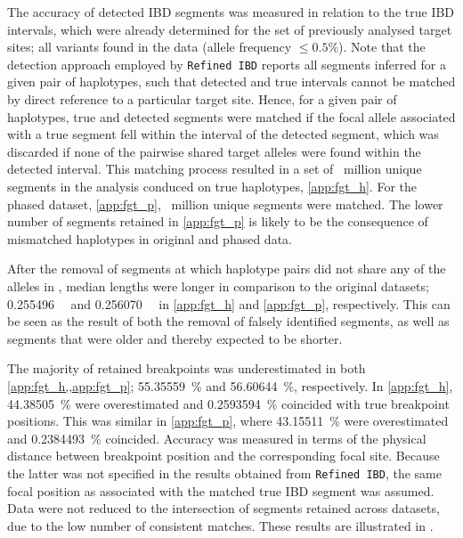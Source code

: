 The accuracy of detected IBD segments was measured in relation to the true IBD intervals, which were already determined for the set of previously analysed target sites; \ie all \fk{[2,25]} variants found in the data (allele frequency $\leq 0.5\%$).
Note that the detection approach employed by \texttt{Refined\,IBD} reports all segments inferred for a given pair of haplotypes, such that detected and true intervals cannot be matched by direct reference to a particular target site.
Hence, for a given pair of haplotypes, true and detected segments were matched if the focal allele associated with a true segment fell within the interval of the detected segment, which was discarded if none of the pairwise shared target alleles were found within the detected interval.
This matching process resulted in a set of ~million unique segments in the analysis conduced on true haplotypes, \cref{app:fgt_h}.
For the phased dataset, \cref{app:fgt_p}, ~million unique segments were matched.
The lower number of segments retained in \cref{app:fgt_p} is likely to be the consequence of mismatched haplotypes in original and phased data.

After the removal of segments at which haplotype pairs did not share any of the alleles in \fk{[2,25]}, median lengths were longer in comparison to the original datasets; \SI{0.255496}{\mega\basepair} and \SI{0.256070}{\mega\basepair} in \ref{app:fgt_h} and \ref{app:fgt_p}, respectively.
This can be seen as the result of both the removal of falsely identified segments, as well as segments that were older and thereby expected to be shorter.

%

%

The majority of retained breakpoints was underestimated in both \cref{app:fgt_h,,app:fgt_p}; \SI{55.35559}{\percent} and \SI{56.60644}{\percent}, respectively.
In \cref{app:fgt_h}, \SI{44.38505}{\percent} were overestimated and \SI{0.2593594}{\percent} coincided with true breakpoint positions.
This was similar in \cref{app:fgt_p}, where \SI{43.15511}{\percent} were overestimated and \SI{0.2384493}{\percent} coincided.
Accuracy was measured in terms of the physical distance between breakpoint position and the corresponding focal site.
Because the latter was not specified in the results obtained from \texttt{Refined\,IBD}, the same focal position as associated with the matched true IBD segment was assumed.
Data were not reduced to the intersection of segments retained across datasets, due to the low number of consistent matches.
These results are illustrated in .

